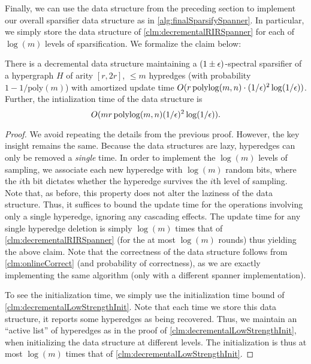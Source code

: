 \documentclass{article}
\begin{document}
Finally, we can use the data structure from the preceding section to implement our overall sparsifier data structure as in \cref{alg:finalSparsifySpanner}. In particular, we simply store the data structure of \cref{clm:decrementalRIRSpanner} for each of $\log(m)$ levels of sparsification. We formalize the claim below:


\begin{claim}\label{clm:decrementalSparsifierUpdateTime}
    There is a decremental data structure maintaining a $(1 \pm \epsilon)$-spectral sparsifier of a hypergraph $H$ of arity $[r, 2r]$, $\leq m$ hypredges (with probability $1 - 1 / \mathrm{poly}(m)$) with amortized update time $O(r\operatorname{polylog}(m,n) \cdot (1/\epsilon)^2\log(1/\epsilon))$. Further, the intialization time of the data structure is 
    \[O(m r \operatorname{polylog}(m,n) (1/\epsilon)^2\log(1/\epsilon)).\]
\end{claim}


\begin{proof}
    We avoid repeating the details from the previous proof. However, the key insight remains the same. Because the data structures are lazy, hyperedges can only be removed a \emph{single} time. In order to implement the $\log(m)$ levels of sampling, we associate each new hyperedge with $\log(m)$ random bits, where the $i$th bit dictates whether the hyperedge survives the $i$th level of sampling. Note that, as before, this property does not alter the laziness of the data structure.
    Thus, it suffices to bound the update time for the operations involving only a single hyperedge, ignoring any cascading effects. The update time for any single hyperedge deletion is simply $\log(m)$ times that of \cref{clm:decrementalRIRSpanner} (for the at most $\log(m)$ rounds)
    thus yielding the above claim. Note that the correctness of the data structure follows from \cref{clm:onlineCorrect} (and probability of correctness), as we are exactly implementing the same algorithm (only with a different spanner implementation). 

    To see the initialization time, we simply use the initialization time bound of \cref{clm:decrementalLowStrengthInit}. Note that each time we store this data structure, it reports some hyperedges as being recovered. Thus, we maintain an ``active list'' of hyperedges as in the proof of \cref{clm:decrementalLowStrengthInit}, when initializing the data structure at different levels. The initialization is thus at most $\log(m)$ times that of \cref{clm:decrementalLowStrengthInit}.
\end{proof}
\end{document}
